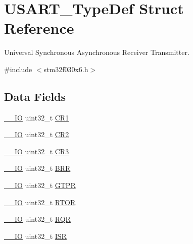 \hypertarget{struct_u_s_a_r_t___type_def}{}\section{U\+S\+A\+R\+T\+\_\+\+Type\+Def Struct Reference}
\label{struct_u_s_a_r_t___type_def}


Universal Synchronous Asynchronous Receiver Transmitter.  




{\ttfamily \#include $<$stm32f030x6.\+h$>$}

\subsection*{Data Fields}
\begin{DoxyCompactItemize}
\item 
\hyperlink{core__sc300_8h_aec43007d9998a0a0e01faede4133d6be}{\+\_\+\+\_\+\+IO} uint32\+\_\+t \hyperlink{struct_u_s_a_r_t___type_def_ab0ec7102960640751d44e92ddac994f0}{C\+R1}
\item 
\hyperlink{core__sc300_8h_aec43007d9998a0a0e01faede4133d6be}{\+\_\+\+\_\+\+IO} uint32\+\_\+t \hyperlink{struct_u_s_a_r_t___type_def_afdfa307571967afb1d97943e982b6586}{C\+R2}
\item 
\hyperlink{core__sc300_8h_aec43007d9998a0a0e01faede4133d6be}{\+\_\+\+\_\+\+IO} uint32\+\_\+t \hyperlink{struct_u_s_a_r_t___type_def_add5b8e29a64c55dcd65ca4201118e9d1}{C\+R3}
\item 
\hyperlink{core__sc300_8h_aec43007d9998a0a0e01faede4133d6be}{\+\_\+\+\_\+\+IO} uint32\+\_\+t \hyperlink{struct_u_s_a_r_t___type_def_a092e59d908b2ca112e31047e942340cb}{B\+RR}
\item 
\hyperlink{core__sc300_8h_aec43007d9998a0a0e01faede4133d6be}{\+\_\+\+\_\+\+IO} uint32\+\_\+t \hyperlink{struct_u_s_a_r_t___type_def_a5dd0cb6c861eaf26470f56f451c1edbf}{G\+T\+PR}
\item 
\hyperlink{core__sc300_8h_aec43007d9998a0a0e01faede4133d6be}{\+\_\+\+\_\+\+IO} uint32\+\_\+t \hyperlink{struct_u_s_a_r_t___type_def_af702fd1614d8606cf715e9f961f2e381}{R\+T\+OR}
\item 
\hyperlink{core__sc300_8h_aec43007d9998a0a0e01faede4133d6be}{\+\_\+\+\_\+\+IO} uint32\+\_\+t \hyperlink{struct_u_s_a_r_t___type_def_aab90d7451f8af4b6e6fd1de6c72d8f22}{R\+QR}
\item 
\hyperlink{core__sc300_8h_aec43007d9998a0a0e01faede4133d6be}{\+\_\+\+\_\+\+IO} uint32\+\_\+t \hyperlink{struct_u_s_a_r_t___type_def_ab3c49a96815fcbee63d95e1e74f20e75}{I\+SR}

\end{DoxyCompactItemize}
